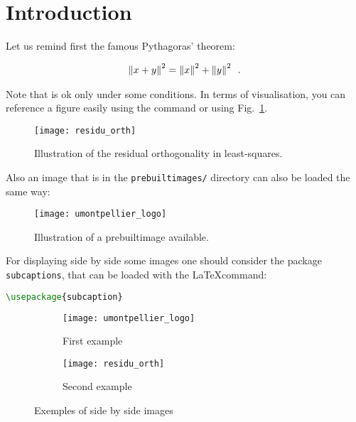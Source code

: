 

\section{Introduction}
\label{sec:introduction}

Let us remind first the famous Pythagoras' theorem:

\begin{align}\label{eq:pythagore}
	\left \lVert x+y \right \rVert^2 = \left \lVert x \right \rVert^2 + \left \lVert y \right \rVert^2 \enspace.
\end{align}

Note that  is ok only under some conditions.
In terms of visualisation, you can reference a figure easily using the command  or using Fig.~\ref{fig:pythagore}.

\begin{figure}[h] %
	\centering
	\texttt{[image: residu\_orth]}
	\caption{Illustration of the residual orthogonality in least-squares.}
	\label{fig:pythagore}
\end{figure}


Also an image that is in the \texttt{prebuiltimages/} directory can also be loaded the same way:

\begin{figure}[h] %
	\centering
	\texttt{[image: umontpellier\_logo]}
	\caption{Illustration of a prebuiltimage available.}
	\label{fig:umontpellier_logo}
\end{figure}


For displaying side by side some images one should consider the package \lstinline+subcaptions+, that can be loaded with the \LaTeX command:

\begin{lstlisting}[language=tex]
\usepackage{subcaption}
\end{lstlisting}


\begin{figure}[t] %
    \centering
    \begin{subfigure}[b]{0.33\textwidth}
    	\centering
        \texttt{[image: umontpellier\_logo]}%
        \caption{First example}
        \label{subfig:pythagore}
    \end{subfigure}
    \begin{subfigure}[b]{0.56\textwidth}
    	\centering
        \texttt{[image: residu\_orth]}%
        \caption{Second example}
        \label{subfig:logo}
    \end{subfigure}
    \caption{Exemples of side by side images}
    \label{fig:double_example}
\end{figure}
